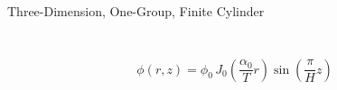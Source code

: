 \begin{frame}{Three-Dimension, One-Group, Finite Cylinder}
  \begin{columns}
    \begin{column}{0.5\textwidth}
      \begin{figure}
        \centering
      \end{figure}
    \end{column}
    \begin{column}{0.5\textwidth}
      \begin{figure}
        \centering
        \vspace*{\fill}
        \vspace*{\fill}
      \end{figure}
    \end{column}
  \end{columns}
  \begin{equation}
    \label{eq:analytic_finite_cyl}
    \phi(r,z) = \phi_0 \, 
      J_0\left(\frac{\alpha_0}{T} r\right) \sin\left(\frac{\pi}{H} z \right)
  \end{equation}
\end{frame}

